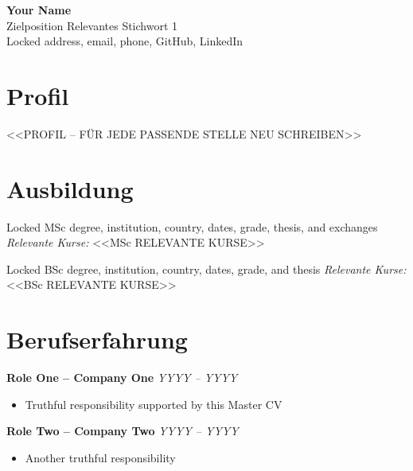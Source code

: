 \documentclass[a4paper,10pt]{article}
\begin{document}
{\Huge \textbf{Your Name}}\\
{\normalsize Zielposition \textbar{} Relevantes Stichwort 1}\\[0.5em]
Locked address, email, phone, GitHub, LinkedIn


\section*{Profil}
<<PROFIL -- FÜR JEDE PASSENDE STELLE NEU SCHREIBEN>>

\section*{Ausbildung}
Locked MSc degree, institution, country, dates, grade, thesis, and exchanges
\textit{Relevante Kurse:} <<MSc RELEVANTE KURSE>>

Locked BSc degree, institution, country, dates, grade, and thesis
\textit{Relevante Kurse:} <<BSc RELEVANTE KURSE>>

\section*{Berufserfahrung}
\textbf{Role One -- Company One} \hfill \textit{YYYY -- YYYY}\\
\begin{itemize}[leftmargin=1.5em, noitemsep]
  \item Truthful responsibility supported by this Master CV
\end{itemize}
\vspace{0.4em}
\textbf{Role Two -- Company Two} \hfill \textit{YYYY -- YYYY}\\
\begin{itemize}[leftmargin=1.5em, noitemsep]
  \item Another truthful responsibility
\end{itemize}
\end{document}
